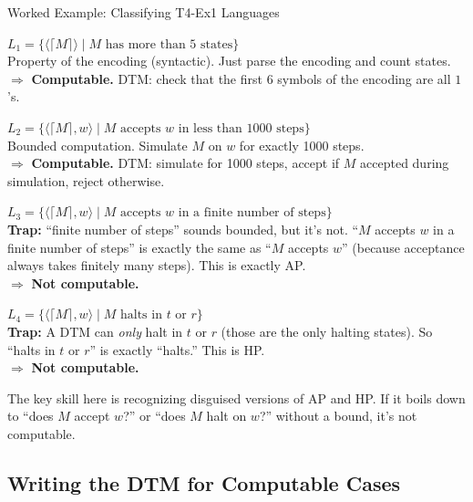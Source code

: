 \documentclass[11pt,a4paper]{article}
\newcommand{\keytakeaway}[1]{%
  \par\vspace{0.3em}%
  \colorbox{yellow!60}{\parbox{\dimexpr\linewidth-2\fboxsep}{#1}}%
  \vspace{0.3em}}
\begin{document}
\begin{examplebox}{Worked Example: Classifying T4-Ex1 Languages}

\textbf{$L_1 = \{\langle \lceil M \rceil \rangle \mid M \text{ has more than 5 states}\}$}\\
Property of the encoding (syntactic). Just parse the encoding and count states.\\
$\Rightarrow$ \textbf{Computable.} DTM: check that the first 6 symbols of the encoding are all $1$'s.

\textbf{$L_2 = \{\langle \lceil M \rceil, w \rangle \mid M \text{ accepts } w \text{ in less than 1000 steps}\}$}\\
Bounded computation. Simulate $M$ on $w$ for exactly 1000 steps.\\
$\Rightarrow$ \textbf{Computable.} DTM: simulate for 1000 steps, accept if $M$ accepted during simulation, reject otherwise.

\textbf{$L_3 = \{\langle \lceil M \rceil, w \rangle \mid M \text{ accepts } w \text{ in a finite number of steps}\}$}\\
\textbf{Trap:} ``finite number of steps'' sounds bounded, but it's not. ``$M$ accepts $w$ in a finite number of steps'' is exactly the same as ``$M$ accepts $w$'' (because acceptance always takes finitely many steps). This is exactly AP.\\
$\Rightarrow$ \textbf{Not computable.}

\textbf{$L_4 = \{\langle \lceil M \rceil, w \rangle \mid M \text{ halts in } t \text{ or } r\}$}\\
\textbf{Trap:} A DTM can \emph{only} halt in $t$ or $r$ (those are the only halting states). So ``halts in $t$ or $r$'' is exactly ``halts.'' This is HP.\\
$\Rightarrow$ \textbf{Not computable.}

\keytakeaway{The key skill here is recognizing disguised versions of AP and HP. If it boils down to ``does $M$ accept $w$?'' or ``does $M$ halt on $w$?'' without a bound, it's not computable.}
\end{examplebox}

\subsection{Writing the DTM for Computable Cases}
\end{document}
